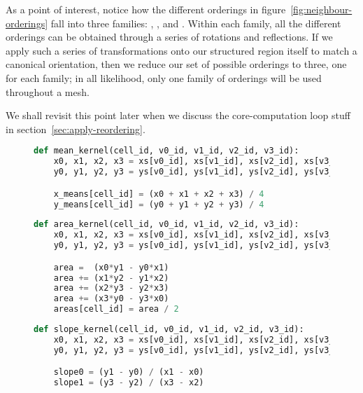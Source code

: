 As a point of interest, notice how the different orderings in figure~\ref{fig:neighbour-orderings} fall into three families: \cfamily{}, \xfamily{}, and \zfamily{}. Within each family, all the different orderings can be obtained through a series of rotations and reflections. If we apply such a series of transformations onto our structured region itself to match a canonical orientation, then we reduce our set of possible orderings to three, one for each family; in all likelihood, only one family of orderings will be used throughout a mesh.

We shall revisit this point later when we discuss the core-computation loop stuff in section~\ref{sec:apply-reordering}.


\begin{figure}
\newsavebox{\meankernel}
\begin{lrbox}{\meankernel}
\begin{lstlisting}[language=python]
def mean_kernel(cell_id, v0_id, v1_id, v2_id, v3_id):
	x0, x1, x2, x3 = xs[v0_id], xs[v1_id], xs[v2_id], xs[v3_id]
	y0, y1, y2, y3 = ys[v0_id], ys[v1_id], ys[v2_id], ys[v3_id]

	x_means[cell_id] = (x0 + x1 + x2 + x3) / 4
	y_means[cell_id] = (y0 + y1 + y2 + y3) / 4
\end{lstlisting}
\end{lrbox}

\newsavebox{\areakernel}
\begin{lrbox}{\areakernel}
\begin{lstlisting}[language=python]
def area_kernel(cell_id, v0_id, v1_id, v2_id, v3_id):
	x0, x1, x2, x3 = xs[v0_id], xs[v1_id], xs[v2_id], xs[v3_id]
	y0, y1, y2, y3 = ys[v0_id], ys[v1_id], ys[v2_id], ys[v3_id]

	area =  (x0*y1 - y0*x1)
	area += (x1*y2 - y1*x2)
	area += (x2*y3 - y2*x3)
	area += (x3*y0 - y3*x0)
	areas[cell_id] = area / 2
\end{lstlisting}
\end{lrbox}

\newsavebox{\slopekernel}
\begin{lrbox}{\slopekernel}
\begin{lstlisting}[language=python]
def slope_kernel(cell_id, v0_id, v1_id, v2_id, v3_id):
	x0, x1, x2, x3 = xs[v0_id], xs[v1_id], xs[v2_id], xs[v3_id]
	y0, y1, y2, y3 = ys[v0_id], ys[v1_id], ys[v2_id], ys[v3_id]

	slope0 = (y1 - y0) / (x1 - x0)
	slope1 = (y3 - y2) / (x3 - x2)


\end{lstlisting}
\end{lrbox}
\end{figure}
